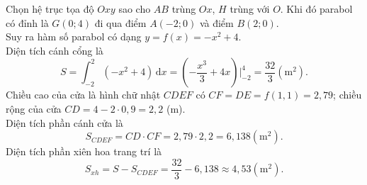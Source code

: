 \begin{bt}
{\begin{center}
\end{center}
Chọn hệ trục tọa độ $Oxy$ sao cho $AB$ trùng $Ox$, $H$ trùng với $O$. Khi đó parabol có đỉnh là $G(0; 4)$ đi  qua điểm $A(-2; 0)$ và điểm $B(2; 0)$.\\
Suy ra hàm số parabol có dạng $y = f(x) =  - x^2 + 4$.\\
Diện tích cánh cổng là $$S = \displaystyle \int_{-2}^{2} \left(-x^2 + 4\right) \mathrm{\,d}x = \left(-\dfrac{x^3}{3} + 4x\right)\bigg|_{-2}^{4}  = \dfrac{32}{3} \left(\text{m}^2\right).$$
Chiều cao của cửa là hình chữ nhật $CDEF$ có $CF = DE = f(1{,}1) = 2{,}79$; chiều rộng của cửa $CD =  4-2\cdot 0{,}9 = 2{,}2$ (m).\\
Diện tích phần cánh cửa là $$S_{CDEF} =  CD\cdot CF = 2{,}79 \cdot 2{,}2 = 6{,}138 \left(\text{m}^2\right).$$
Diện tích phần xiên hoa trang trí là $$S_{xh} = S - S_{CDEF} = \dfrac{32}{3} - 6{,}138 \approx  4{,}53 \left(\text{m}^2\right).$$
} 
\end{bt}

